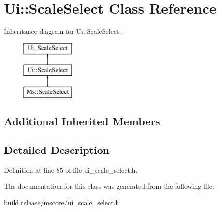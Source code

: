 \hypertarget{class_ui_1_1_scale_select}{}\section{Ui\+:\+:Scale\+Select Class Reference}
\label{class_ui_1_1_scale_select}
Inheritance diagram for Ui\+:\+:Scale\+Select\+:\begin{figure}[H]
\begin{center}
\leavevmode
\includegraphics[height=3.000000cm]{class_ui_1_1_scale_select}
\end{center}
\end{figure}
\subsection*{Additional Inherited Members}


\subsection{Detailed Description}


Definition at line 85 of file ui\+\_\+scale\+\_\+select.\+h.



The documentation for this class was generated from the following file\+:\begin{DoxyCompactItemize}
\item 
build.\+release/mscore/ui\+\_\+scale\+\_\+select.\+h\end{DoxyCompactItemize}
